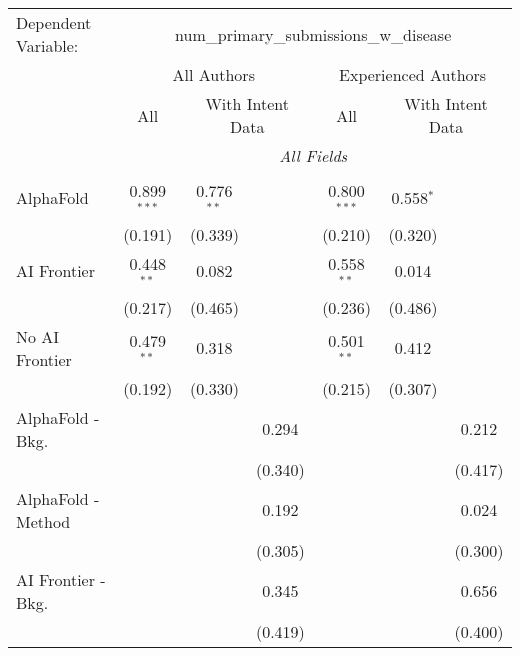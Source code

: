 \begingroup
\centering
\begin{tabular}{lcccccc}
   \tabularnewline \midrule \midrule
   Dependent Variable: & \multicolumn{6}{c}{num\_primary\_submissions\_w\_disease}\\
 & \multicolumn{3}{c}{All Authors} & \multicolumn{3}{c}{Experienced Authors} \\
\cmidrule(lr){2-4} \cmidrule(lr){5-7}
 & \multicolumn{1}{c}{All} & \multicolumn{2}{c}{With Intent Data} & \multicolumn{1}{c}{All} & \multicolumn{2}{c}{With Intent Data} \\
\cmidrule(lr){2-2} \cmidrule(lr){3-4} \cmidrule(lr){5-5} \cmidrule(lr){6-7}
 & \multicolumn{6}{c}{\textit{All Fields}} \\ \\
   AlphaFold               & 0.899$^{***}$ & 0.776$^{**}$ &              & 0.800$^{***}$ & 0.558$^{*}$ &   \\   
                           & (0.191)       & (0.339)      &              & (0.210)       & (0.320)     &   \\   
   AI Frontier             & 0.448$^{**}$  & 0.082        &              & 0.558$^{**}$  & 0.014       &   \\   
                           & (0.217)       & (0.465)      &              & (0.236)       & (0.486)     &   \\   
   No AI Frontier          & 0.479$^{**}$  & 0.318        &              & 0.501$^{**}$  & 0.412       &   \\   
                           & (0.192)       & (0.330)      &              & (0.215)       & (0.307)     &   \\   
   AlphaFold - Bkg.        &               &              & 0.294        &               &             & 0.212\\   
                           &               &              & (0.340)      &               &             & (0.417)\\   
   AlphaFold - Method      &               &              & 0.192        &               &             & 0.024\\   
                           &               &              & (0.305)      &               &             & (0.300)\\   
   AI Frontier - Bkg.      &               &              & 0.345        &               &             & 0.656\\   
                           &               &              & (0.419)      &               &             & (0.400)\\   

\end{tabular}
